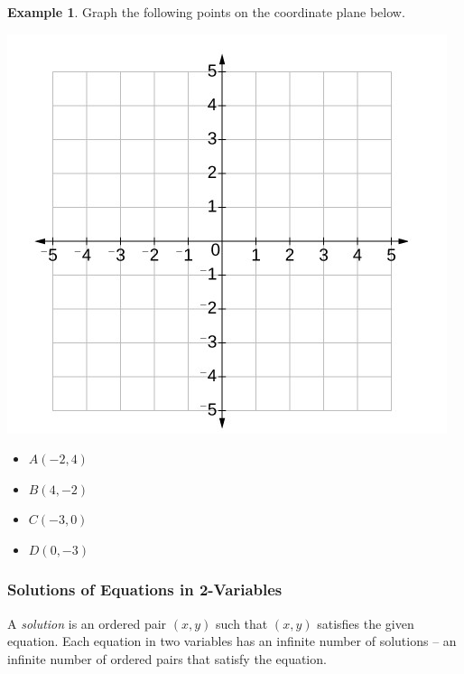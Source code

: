 \documentclass[addpoints,12pt]{exam}
\theoremstyle{definition}
\theoremstyle{break}
\theoremstyle{break}
\newtheorem{example}{Example}[subsection]
\begin{document}
\begin{example}
Graph the following points on the coordinate plane below.

\begin{minipage}{.60\textwidth}
\includegraphics[scale=.75]{../images/cartesian_plane}
\end{minipage}%
\begin{minipage}{.4\textwidth}
\begin{itemize}
\item $A(-2,4)$
\item $B(4,-2)$
\item $C(-3,0)$
\item $D(0,-3)$
\end{itemize}
\end{minipage}%
\end{example}

\newpage

\subsubsection*{Solutions of Equations in 2-Variables}

\noindent A \emph{solution} is an ordered pair $(x,y)$ such that $(x,y)$ satisfies the given equation. Each equation in two variables has an infinite number of solutions -- an infinite number of ordered pairs that satisfy the equation.

\vspace{.15in}
\end{document}
